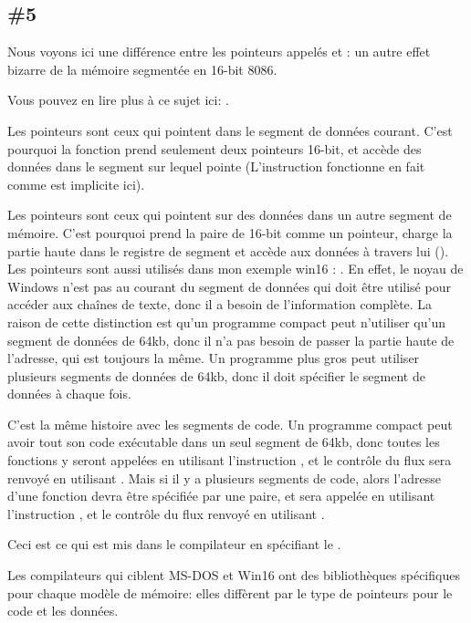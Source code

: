 \subsection{\Example{} \#5}
\label{win16_near_far_pointers}





Nous voyons ici une différence entre les pointeurs appelés  et : un
autre effet bizarre de la mémoire segmentée en 16-bit 8086.

Vous pouvez en lire plus à ce sujet ici: .

Les pointeurs  sont ceux qui pointent dans le segment de données courant.
C'est pourquoi la fonction  prend seulement deux pointeurs 16-bit,
et accède des données dans le segment sur lequel  pointe (L'instruction 
fonctionne en fait comme \EMDASH{} est implicite ici).

Les pointeurs  sont ceux qui pointent sur des données dans un autre segment
de mémoire.
C'est pourquoi  prend la paire de 16-bit comme un pointeur,
charge la partie haute dans le registre de segment  et accède aux données
à travers lui ().
Les pointeurs  sont aussi utilisés dans mon exemple win16
: .
En effet, le noyau de Windows n'est pas au courant du segment de données qui doit être
utilisé pour accéder aux chaînes de texte, donc il a besoin de l'information complète.
La raison de cette distinction est qu'un programme compact peut n'utiliser qu'un
segment de données de 64kb, donc il n'a pas besoin de passer la partie haute de l'adresse,
qui est toujours la même.
Un programme plus gros peut utiliser plusieurs segments de données de 64kb, donc il
doit spécifier le segment de données à chaque fois.

C'est la même histoire avec les segments de code.
Un programme compact peut avoir tout son code exécutable dans un seul segment de 64kb,
donc toutes les fonctions y seront appelées en utilisant l'instruction ,
et le contrôle du flux sera renvoyé en utilisant .
Mais si il y a plusieurs segments de code, alors l'adresse d'une fonction devra être
spécifiée par une paire, et sera appelée en utilisant l'instruction ,
et le contrôle du flux renvoyé en utilisant .

Ceci est ce qui est mis dans le compilateur en spécifiant le .

Les compilateurs qui ciblent MS-DOS et Win16 ont des bibliothèques spécifiques pour
chaque modèle de mémoire: elles diffèrent par le type de pointeurs pour le code et
les données.

